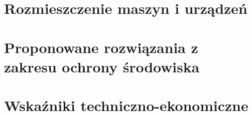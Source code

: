 \documentclass{article}
\begin{document}












\section{Rozmieszczenie maszyn i urządzeń}







\section{Proponowane rozwiązania z zakresu ochrony środowiska}



\section{Wskaźniki techniczno-ekonomiczne}

\newpage
\renewcommand*{\bibfont}{\small}
\printbibliography
\end{document}
